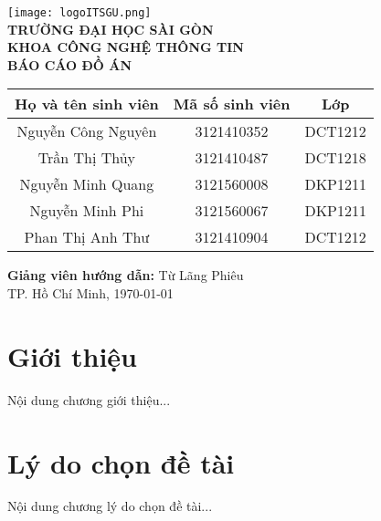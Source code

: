 \documentclass[a4paper,12pt]{report}  %
\begin{document}

\begin{titlepage}
    \centering
    \texttt{[image: logoITSGU.png]} \\[1cm]
    \textbf{\Large TRƯỜNG ĐẠI HỌC SÀI GÒN} \\[0.5cm]
    \textbf{\Large KHOA CÔNG NGHỆ THÔNG TIN} \\[2cm]
    {\Huge \textbf{BÁO CÁO ĐỒ ÁN}} \\[2cm]

    \begin{center}
        \begin{tabular}{|c|c|c|}
            \hline
            \textbf{Họ và tên sinh viên} & \textbf{Mã số sinh viên} & \textbf{Lớp} \\
            \hline
            Nguyễn Công Nguyên & 3121410352 & DCT1212 \\
            \hline
            Trần Thị Thủy & 3121410487 & DCT1218 \\
            \hline
            Nguyễn Minh Quang & 3121560008 & DKP1211 \\
            \hline
            Nguyễn Minh Phi & 3121560067 & DKP1211 \\
            \hline
            Phan Thị Anh Thư & 3121410904 & DCT1212 \\
            \hline
        \end{tabular}
    \end{center}
    
    \vspace{1cm}
    \textbf{Giảng viên hướng dẫn:} Từ Lãng Phiêu \\

    \vfill
    TP. Hồ Chí Minh, \today
\end{titlepage}

\newpage  %

\tableofcontents
\newpage

\chapter{Giới thiệu}
Nội dung chương giới thiệu...

\chapter{Lý do chọn đề tài}
Nội dung chương lý do chọn đề tài...
\end{document}
